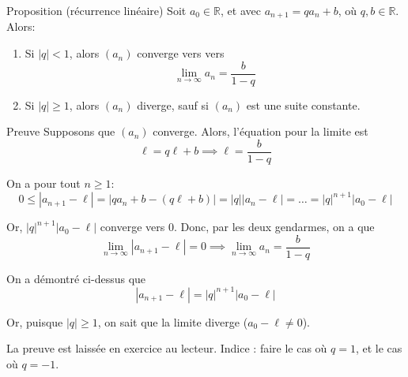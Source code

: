 \documentclass[a4paper]{article}
\begin{document}
\begin{parag}{Proposition (récurrence linéaire)}
    Soit $a_0 \in \mathbb{R}$, et avec $a_{n+1} = q a_n + b$, où $q, b \in \mathbb{R}$. Alors:
    \begin{enumerate}
        \item Si $\left|q\right| < 1$, alors $\left(a_n\right)$ converge vers vers
            \[\lim_{n \to \infty} a_n = \frac{b}{1-q}\]
        \item Si $\left|q\right| \geq 1$, alors $\left(a_n\right)$ diverge, sauf si $\left(a_n\right)$ est une suite constante.
    \end{enumerate}


    \begin{subparag}{Preuve}
        Supposons que $\left(a_n\right)$ converge. Alors, l'équation pour la limite est
        \[\ell = q \ell + b \implies \ell = \frac{b}{1-q}\]

         On a pour tout $n \geq 1$:
        \[0 \leq \left|a_{n+1} - \ell\right| = \left|q a_n + b - \left(q\ell + b\right)\right| = \left|q\right|\left|a_n - \ell\right| = \ldots = \left|q\right|^{n+1}\left|a_0 - \ell\right|\]

        Or, $\left|q\right|^{n+1}\left|a_0 - \ell\right|$ converge vers 0. Donc, par les deux gendarmes, on a que
        \[\lim_{n \to \infty} \left|a_{n+1} - \ell\right| = 0 \implies \lim_{n \to \infty} a_n = \frac{b}{1-q}\]

        \vspace{1em}
         On a démontré ci-dessus que
        \[\left|a_{n+1} - \ell\right| = \left|q\right|^{n+1} \left|a_0 - \ell\right|\]

        Or, puisque $\left|q\right| \geq 1$, on sait que la limite diverge ($a_0 - \ell \neq 0$).

        \vspace{1em}
         La preuve est laissée en exercice au lecteur. Indice : faire le cas où $q = 1$, et le cas où $q = -1$.
    \end{subparag}
\end{parag}
\end{document}
